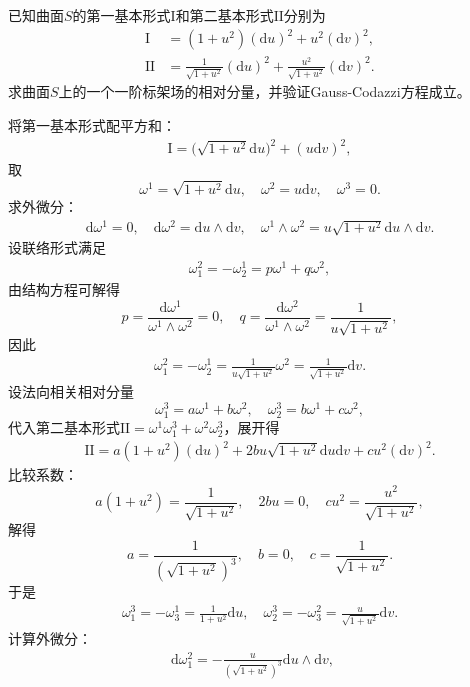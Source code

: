 \documentclass[../../main.tex]{subfiles}%
\begin{document}
\begin{example}
已知曲面$S$的第一基本形式$\mathrm{I}$和第二基本形式$\mathrm{II}$分别为
\begin{align*}
\mathrm{I} &= (1+u^2)(\mathrm{d}u)^2 + u^2(\mathrm{d}v)^2, \\
\mathrm{II} &= \frac{1}{\sqrt{1+u^2}}(\mathrm{d}u)^2 + \frac{u^2}{\sqrt{1+u^2}}(\mathrm{d}v)^2.
\end{align*}
求曲面$S$上的一个一阶标架场的相对分量，并验证Gauss-Codazzi方程成立。\begin{solution}
将第一基本形式配平方和：
\begin{align*}
\mathrm{I} = \big(\sqrt{1+u^2}\mathrm{d}u\big)^2 + (u\mathrm{d}v)^2,
\end{align*}
取
$$\omega^1 = \sqrt{1+u^2}\mathrm{d}u,\quad \omega^2 = u\mathrm{d}v,\quad \omega^3=0.$$
求外微分：
\begin{align*}
\mathrm{d}\omega^1 = 0, \quad
\mathrm{d}\omega^2 = \mathrm{d}u\land\mathrm{d}v, \quad
\omega^1\land\omega^2 = u\sqrt{1+u^2}\mathrm{d}u\land\mathrm{d}v.
\end{align*}
设联络形式满足
\begin{align}
\omega_1^2 = -\omega_2^1 = p\omega^1 + q\omega^2, \label{eq:conn_form_def}
\end{align}
由结构方程可解得
$$p = \frac{\mathrm{d}\omega^1}{\omega^1\land\omega^2}=0,\quad q = \frac{\mathrm{d}\omega^2}{\omega^1\land\omega^2}=\frac{1}{u\sqrt{1+u^2}},$$
因此
\begin{align*}
\omega_1^2 = -\omega_2^1 = \frac{1}{u\sqrt{1+u^2}}\omega^2 = \frac{1}{\sqrt{1+u^2}}\mathrm{d}v.
\end{align*}
设法向相关相对分量
$$\omega_1^3 = a\omega^1 + b\omega^2,\quad \omega_2^3 = b\omega^1 + c\omega^2,$$
代入第二基本形式$\mathrm{II}=\omega^1\omega_1^3+\omega^2\omega_2^3$，展开得
\begin{align*}
\mathrm{II}=a(1+u^2)(\mathrm{d}u)^2 + 2bu\sqrt{1+u^2}\mathrm{d}u\mathrm{d}v + cu^2(\mathrm{d}v)^2.
\end{align*}
比较系数：
$$a(1+u^2)=\frac{1}{\sqrt{1+u^2}},\quad 2bu=0,\quad cu^2=\frac{u^2}{\sqrt{1+u^2}},$$
解得
$$a=\frac{1}{(\sqrt{1+u^2})^3},\quad b=0,\quad c=\frac{1}{\sqrt{1+u^2}}.$$
于是
\begin{align*}
\omega_1^3 = -\omega_3^1 = \frac{1}{1+u^2}\mathrm{d}u, \quad
\omega_2^3 = -\omega_3^2 = \frac{u}{\sqrt{1+u^2}}\mathrm{d}v.
\end{align*}
计算外微分：
\begin{align*}
\mathrm{d}\omega_1^2 = -\frac{u}{(\sqrt{1+u^2})^3}\mathrm{d}u\land\mathrm{d}v, \quad

\end{align*}
\end{solution}
\end{example}
\end{document}
